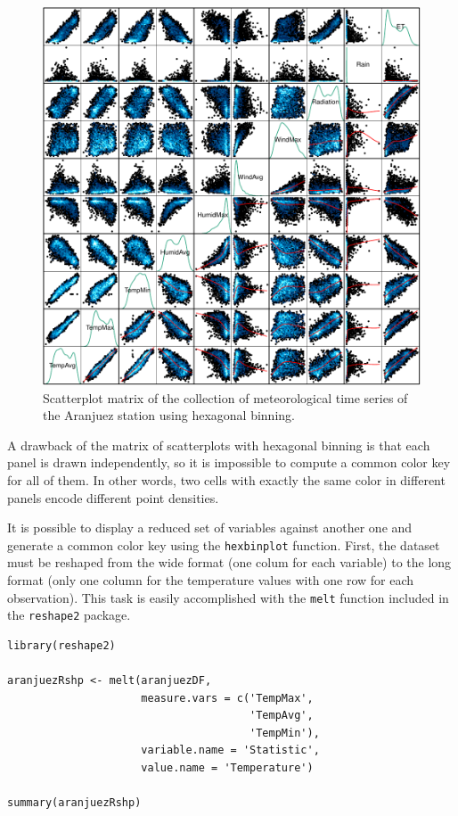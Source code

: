 \documentclass[smallroyalvopaper]{memoir}
\begin{document}
\begin{figure}[htbp]
\centering
\includegraphics[width=.9\linewidth]{figs/aranjuezSplomHexbin.pdf}
\caption{Scatterplot matrix of the collection of meteorological time series of the Aranjuez station using hexagonal binning. \label{fig:aranjuezSplomHexbin}}
\end{figure}

A drawback of the matrix of scatterplots with hexagonal binning is
that each panel is drawn independently, so it is impossible to compute
a common color key for all of them. In other words, two cells with
exactly the same color in different panels encode different point
densities.

It is possible to display a reduced set of variables against another
one and generate a common color key using the \texttt{hexbinplot}
function. First, the dataset must be reshaped from the wide format
(one colum for each variable) to the long format (only one column for
the temperature values with one row for each observation). This task
is easily accomplished with the \texttt{melt} function included in the
\texttt{reshape2} package.


\lstset{language=r,label= ,caption= ,captionpos=b,numbers=none}
\begin{lstlisting}
library(reshape2)

aranjuezRshp <- melt(aranjuezDF,
                     measure.vars = c('TempMax',
                                      'TempAvg',
                                      'TempMin'),
                     variable.name = 'Statistic',
                     value.name = 'Temperature')

summary(aranjuezRshp)
\end{lstlisting}
\end{document}
